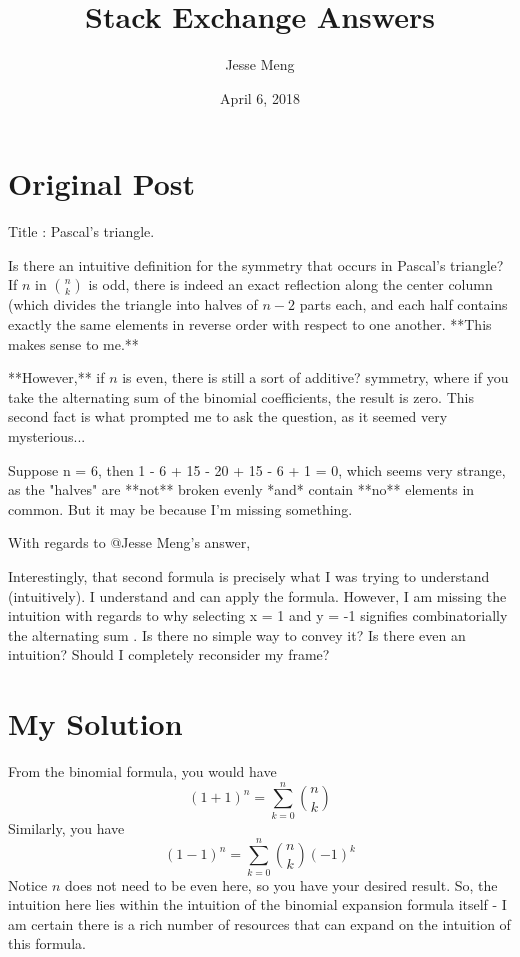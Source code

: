 \documentclass{article}
\title{Stack Exchange Answers}
\author{Jesse Meng }
\date{April 6, 2018}
\begin{document}
\maketitle

\section{Original Post}
Title : Pascal's triangle.

Is there an intuitive definition for the symmetry that occurs in Pascal's triangle? If $n$ in $\binom{n}{k}$ is odd, there is indeed an exact reflection along the center column (which divides the triangle into halves of $n-2$ parts each, and each half contains exactly the same elements in reverse order with respect to one another. **This makes sense to me.**


**However,** if $n$ is even, there is still a sort of additive? symmetry, where if you take the alternating sum of the binomial coefficients, the result is zero. This second fact is what prompted me to ask the question, as it seemed very mysterious...

 Suppose n = 6, then 1 - 6 + 15 - 20 + 15 - 6 + 1 = 0, which seems very strange, as the "halves" are **not** broken evenly *and* contain **no** elements in common. But it may be because I'm missing something.

With regards to @Jesse Meng's answer, 

Interestingly, that second formula is precisely what I was trying to understand (intuitively). I understand and can apply the formula. However, I am missing the intuition with regards to why selecting x = 1 and y = -1 signifies combinatorially the alternating sum . Is there no simple way to convey it? Is there even an intuition? Should I completely reconsider my frame?
\section{My Solution}
From the binomial formula, you would have $$(1+1)^n=\sum_{k=0}^{n}\binom{n}{k}$$
Similarly, you have $$(1-1)^n=\sum_{k=0}^{n}\binom{n}{k}(-1)^k$$
Notice $n$ does not need to be even here, so you have your desired result. So, the intuition here lies within the intuition of the binomial expansion formula itself - I am certain there is a rich number of resources that can expand on the intuition of this formula.
\end{document}
